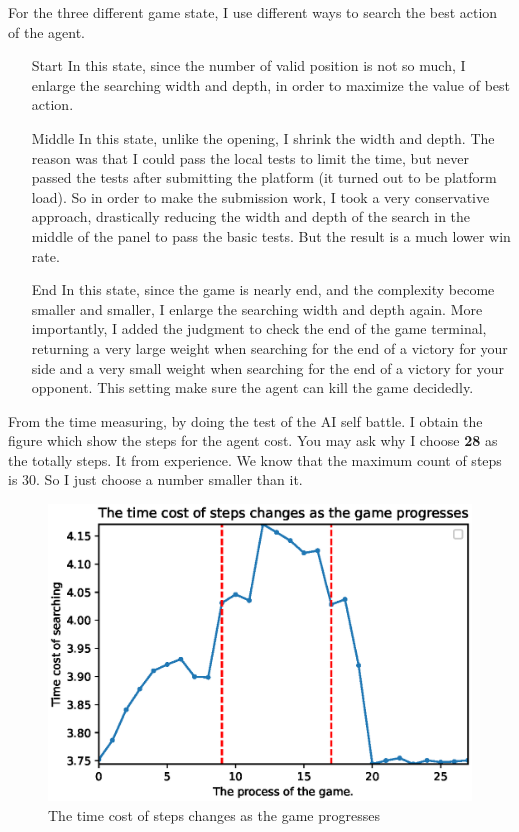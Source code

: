 \documentclass[conference,compsoc]{IEEEtran}
\begin{document}
For the three different game state, I use different ways to search the best action of the agent.

\begin{itemize}
\item [Start] In this state, since the number of valid position is not so much, I enlarge the searching width and depth, in order to maximize the value of best action.

\item [Middle] In this state, unlike the opening, I shrink the width and depth. The reason was that I could pass the local tests to limit the time, but never passed the tests after submitting the platform (it turned out to be platform load). So in order to make the submission work, I took a very conservative approach, drastically reducing the width and depth of the search in the middle of the panel to pass the basic tests. But the result is a much lower win rate.

\item [End] In this state, since the game is nearly end, and the complexity become smaller and smaller, I enlarge the searching width and depth again. More importantly, I added the judgment to check the end of the game terminal, returning a very large weight when searching for the end of a victory for your side and a very small weight when searching for the end of a victory for your opponent. This setting make sure the agent can kill the game decidedly.
\end{itemize}

From the time measuring, by doing the test of the AI self battle. I obtain the figure which show the steps for the agent cost. You may ask why I choose \textbf{28} as the totally steps. It from experience. We know that the maximum count of steps is 30. So I just choose a number smaller than it.

\begin{figure}[htbp]
\begin{center}
\includegraphics[width=.4\textwidth]{fig/2.eps}
\end{center}
\caption{The time cost of steps changes as the game progresses}
\label{Fig5}
\end{figure}
\end{document}
